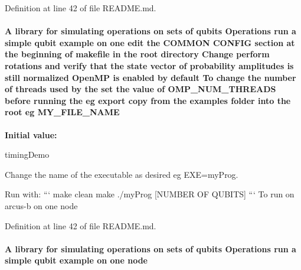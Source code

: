 Definition at line 42 of file README.md.\hypertarget{README_8md_a5e27239809b7b98bd9a7f543012390be}{
\paragraph[{MY\_\-FILE\_\-NAME}]{\setlength{\rightskip}{0pt plus 5cm}A library for simulating operations on sets of qubits Operations run a simple qubit example on one edit the COMMON CONFIG section at the beginning of makefile in the root directory Change perform {\bf rotations} and verify that the state vector of probability amplitudes {\bf is} still normalized OpenMP {\bf is} enabled by default To change the number of threads used by the set the value of {\bf OMP\_\-NUM\_\-THREADS} before running the {\bf eg} export copy from the examples {\bf folder} into the root {\bf eg} {\bf MY\_\-FILE\_\-NAME}}\hfill}
\label{README_8md_a5e27239809b7b98bd9a7f543012390be}
{\bfseries Initial value:}
\begin{DoxyCode}
timingDemo 

Change the name of the executable as desired eg EXE=myProg.

Run with:
```
make clean
make
./myProg [NUMBER OF QUBITS] 
```
To run on arcus-b on one node
\end{DoxyCode}


Definition at line 42 of file README.md.\hypertarget{README_8md_a99a33b7cbd048786ffbadbc8d8996086}{
\paragraph[{node}]{\setlength{\rightskip}{0pt plus 5cm}A library for simulating operations on sets of qubits Operations run a simple qubit example on one {\bf node}}\hfill}
\label{README_8md_a99a33b7cbd048786ffbadbc8d8996086}


